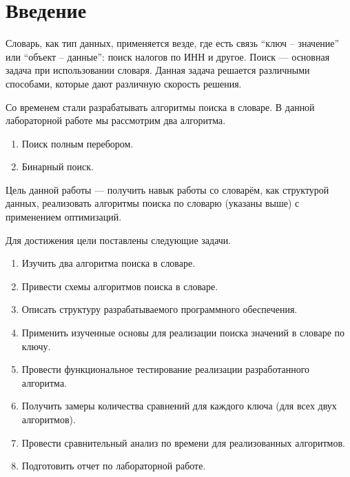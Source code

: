\chapter*{Введение}

Словарь, как тип данных, применяется везде, где есть связь “ключ -- значение” или “объект -- данные”: поиск налогов по ИНН и другое. Поиск --- основная задача при использовании словаря. Данная задача решается различными способами, которые дают различную скорость решения.

Со временем стали разрабатывать алгоритмы поиска в словаре. В данной лабораторной работе мы рассмотрим два алгоритма.
\begin{enumerate}
	\item Поиск полным перебором.
	\item Бинарный поиск.
\end{enumerate}

Цель данной работы --- получить навык работы со словарём, как структурой данных, реализовать алгоритмы поиска по словарю (указаны выше) с применением оптимизаций.

Для достижения цели поставлены следующие задачи.
\begin{enumerate}
	\item Изучить два алгоритма поиска в словаре.
	\item Привести схемы алгоритмов поиска в словаре.
	\item Описать структуру разрабатываемого программного обеспечения.
	\item Применить изученные основы для реализации поиска значений в словаре по ключу.
	\item Провести функциональное тестирование реализации разработанного алгоритма.
	\item Получить замеры количества сравнений для каждого ключа (для всех двух алгоритмов).
	\item Провести сравнительный анализ по времени для реализованных алгоритмов.
	\item Подготовить отчет по лабораторной работе.
\end{enumerate}